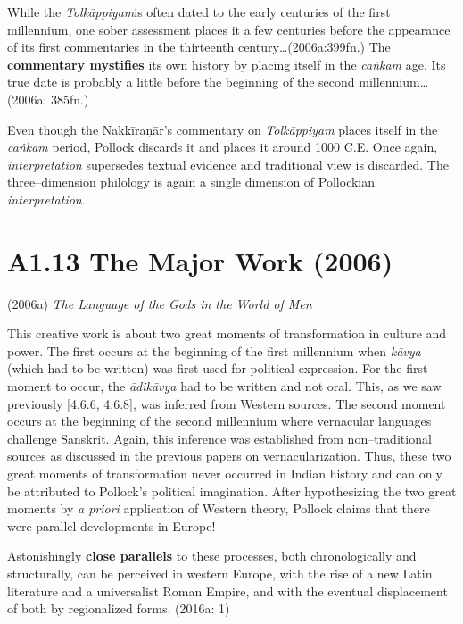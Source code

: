 {{{\begin{myquote}
While the \textit{Tolkāppiyam}is often dated to the early centuries of the first millennium, one sober assessment places it a few centuries before the appearance of its first commentaries in the thirteenth century…(2006a:399fn.) The \textbf{commentary mystifies} its own history by placing itself in the \textit{caṅkam} age. Its true date is probably a little before the beginning of the second millennium…(2006a: 385fn.)
\end{myquote}

Even though the Nakkīraṇār’s commentary on \textit{Tolkāppiyam }places itself in the \textit{caṅkam} period, Pollock discards it and places it around 1000 C.E. Once again, \textit{interpretation} supersedes textual evidence and traditional view is discarded. The three–dimension philology is again a single dimension of Pollockian \textit{interpretation}.


\vspace{-.3cm}

\section*{A1.13 The Major Work (2006)}

(2006a)\textit{ The Language of the Gods in the World of Men}

This creative work is about two great moments of transformation in culture and power. The first occurs at the beginning of the first millennium when \textit{kāvya }(which had to be written) was first used for political expression. For the first moment to occur, the\textit{ ādikāvya }had to be written and not oral. This, as we saw previously [4.6.6, 4.6.8], was inferred from Western sources. The second moment occurs at the beginning of the second millennium where vernacular languages challenge Sanskrit. Again, this inference was established from non–traditional sources as discussed in the previous papers on vernacularization. Thus, these two great moments of transformation never occurred in Indian history and can only be attributed to Pollock’s political imagination. After hypothesizing the two great moments by \textit{a priori} application of Western theory, Pollock claims that there were parallel developments in Europe!

\begin{myquote}
Astonishingly \textbf{close parallels} to these processes, both chronologically and structurally, can be perceived in western Europe, with the rise of a new Latin literature and a universalist Roman Empire, and with the eventual displacement of both by regionalized forms. (2016a: 1)
\end{myquote}

}}}
